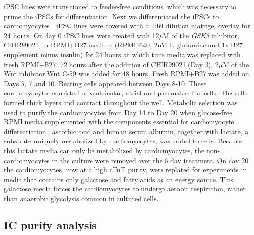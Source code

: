 \documentclass[9pt,lineno]{elife}
\begin{document}
iPSC lines were transitioned to feeder-free conditions, which was necessary to prime the iPSCs for differentiation. Next we differentiated the iPSCs to cardiomyocytes \citep{Lian2013, Burridge2014}. iPSC lines were covered with a 1:60 dilution matrigel overlay for 24 hours. On day 0 iPSC lines were treated with 12$\mu$M of the \emph{GSK3} inhibitor, CHIR99021, in RPMI+B27 medium (RPMI1640, 2nM L-glutamine and 1x B27 supplement minus insulin) for 24 hours at which time media was replaced with fresh RPMI+B27. 72 hours after the addition of CHIR99021 (Day 3), 2$\mu$M of the Wnt inhibitor Wnt C-59 was added for 48 hours.  Fresh RPMI+B27 was added on Days 5, 7 and 10. Beating cells appeared between Days 8-10. These cardiomyocytes consisted of ventricular, atrial and pacemaker-like cells. The cells formed thick layers and contract throughout the well. Metabolic selection was used to purify the cardiomyocytes \citep{Tohyama2013-hb} from Day 14 to Day 20 when glucose-free RPMI media supplemented with the components essential for cardiomyocyte differentiation \citep{Burridge2014}, ascorbic acid and human serum albumin, together with lactate, a substrate uniquely metabolized by cardiomyocytes, was added to cells. Because this lactate media can only be metabolized by cardiomyocytes, the non-cardiomyocytes in the culture were removed over the 6 day treatment. On day 20 the cardiomyocytes, now at a high cTnT purity, were replated for experiments in media that contains only galactose and fatty acids as an energy source. This galactose media forces the cardiomyocytes to undergo aerobic respiration, rather than anaerobic glycolysis common in cultured cells.

\subsection*{IC purity analysis}
\end{document}
